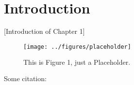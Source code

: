 
\section{Introduction}

[Introduction of Chapter 1]

\begin{figure}
    \texttt{[image: ../figures/placeholder]}
    \caption{This is Figure 1, just a Placeholder.}
\end{figure}


Some citation: \cite{Abbring2007}